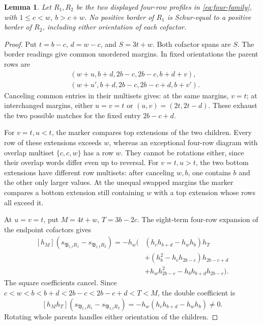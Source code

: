 \documentclass[11pt,a4paper]{amsart}
\numberwithin{equation}{section}
\theoremstyle{plain}
\newtheorem{lemma}[theorem]{Lemma}
\theoremstyle{definition}
\newcommand{\B}{\mathfrak B}
\begin{document}
\begin{lemma}\label{lem:four-border}
Let \(R_1,R_2\) be the two displayed four-row profiles in
\eqref{eq:four-family}, with \(1\le c<w\), \(b>c+w\).
No positive border of \(R_1\) is Schur-equal to a positive border of
\(R_2\), including either orientation of each cofactor.
\end{lemma}

\begin{proof}
Put \(t=b-c\), \(d=w-c\), and \(S=3t+w\).
Both cofactor spans are \(S\).  The border readings give common unordered
margins.  In fixed orientations the parent rows are
\[
 \begin{aligned}
 &(w+u,b+d,2b-c,2b-c,b+d+v),\\
 &(w+u',b+d,2b-c,2b-c+d,b+v').
 \end{aligned}
\]
Canceling common entries in their multisets gives: at the same margins,
\(v=t\); at interchanged margins, either \(u=v=t\) or
\((u,v)=(2t,2t-d)\).  These exhaust the two possible matches for the
fixed entry \(2b-c+d\).

For \(v=t,u<t\), the marker compares top extensions of the two children.
Every row of these extensions exceeds \(w\), whereas an exceptional
four-row diagram with overlap multiset \(\{c,c,w\}\) has a row \(w\).
They cannot be rotations either, since their overlap words differ even
up to reversal.  For \(v=t,u>t\), the two bottom extensions have different
row multisets: after canceling \(w,b\), one contains \(b\) and the other
only larger values.  At the unequal swapped margins the marker compares
a bottom extension still containing \(w\) with a top extension whose
rows all exceed it.

At \(u=v=t\), put \(M=4t+w\), \(T=3b-2c\).
The eight-term four-row expansion of the endpoint cofactors gives
\[
 \begin{split}
 [h_M](s_{\B_{t,t}R_1}-s_{\B_{t,t}R_2})=-h_w\bigl(&
 (h_ch_{b+d}-h_wh_b)h_T\\
 &+(h_b^2-h_ch_{2b-c})h_{2b-c+d}\\
 &+h_wh_{2b-c}^2-h_bh_{b+d}h_{2b-c}\bigr).
 \end{split}
\]
The square coefficients cancel.  Since
\(c<w<b<b+d<2b-c<2b-c+d<T<M\), the double coefficient is
\begin{equation}\label{eq:four-border-separator}
 [h_Mh_T](s_{\B_{t,t}R_1}-s_{\B_{t,t}R_2})
 =-h_w(h_ch_{b+d}-h_wh_b)\ne0.
\end{equation}
Rotating whole parents handles either orientation of the children.
\end{proof}
\end{document}
